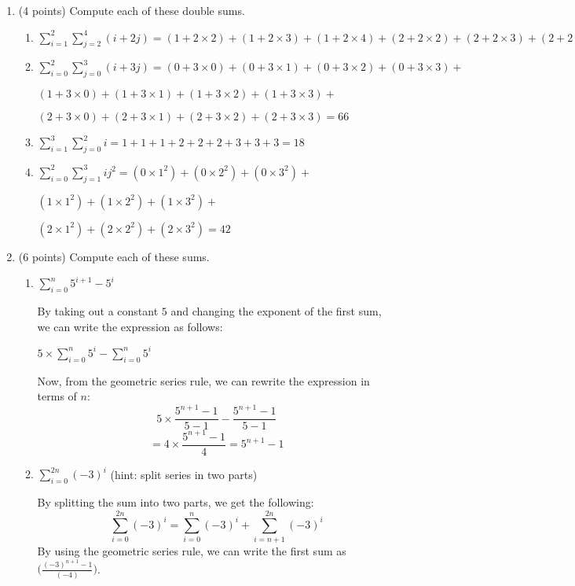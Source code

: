 \documentclass[11pt]{article}
\begin{document}
\begin{enumerate}
\item(4 points) Compute each of these double sums.
\begin{enumerate}
\item $\sum_{i=1}^2\sum_{j=2}^4(i+2j) = (1 + 2 \times 2) + (1 + 2 \times 3) + (1 + 2 \times 4) + (2 + 2 \times 2) + (2 + 2 \times 3) + (2 + 2 \times 4) = 45$


\item $\sum_{i=0}^2\sum_{j=0}^3(i+3j) = (0 + 3 \times 0) + (0 + 3 \times 1) + (0 + 3 \times 2) + (0 + 3 \times 3) + $

$(1 + 3 \times 0) + (1 + 3 \times 1) + (1 + 3 \times 2) + (1 + 3 \times 3) + $

$(2 + 3 \times 0) + (2 + 3 \times 1) + (2 + 3 \times 2) + (2 + 3 \times 3) = 66$


\item $\sum_{i=1}^3\sum_{j=0}^2 i = 1 + 1 + 1 + 2 + 2 + 2 + 3 + 3 + 3 = 18$


\item $\sum_{i=0}^2\sum_{j=1}^3 ij^2 = (0 \times 1^2) + (0 \times 2^2) + (0 \times 3^2) + $

$(1 \times 1^2) + (1 \times 2^2) + (1 \times 3^2) + $

$(2 \times 1^2) + (2 \times 2^2) + (2 \times 3^2) = 42$

\end{enumerate}

\newpage

\item(6 points) Compute each of these sums.
\begin{enumerate}
\item $\sum_{i=0}^n 5^{i+1}-5^i$

By taking out a constant $5$ and changing the exponent of the first sum, we can write the expression as follows:

$5 \times \sum_{i=0}^n 5^i - \sum_{i=0}^n 5^i$

Now, from the geometric series rule, we can rewrite the expression in terms of $n$:
$$ 5 \times \frac{5^{n+1}-1}{5-1} - \frac{5^{n+1}-1}{5-1} $$
$$ = 4 \times \frac{5^{n+1}-1}{4} = 5^{n+1} - 1$$

\item $\sum_{i=0}^{2n} (-3)^i$  (hint: split series in two parts)

By splitting the sum into two parts, we get the following:
$$ \sum_{i=0}^{2n} (-3)^i = \sum_{i=0}^{n} (-3)^i + \sum_{i = n+1}^{2n} (-3)^i $$
By using the geometric series rule, we can write the first sum as $\bigg( \frac{(-3)^{n+1} - 1}{(-4)} \bigg)$.  


\end{enumerate}
\end{enumerate}
\end{document}
